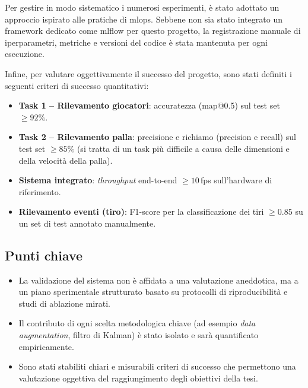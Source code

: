 \documentclass[12pt,a4paper,openright,twoside]{book}
\begin{document}
Per gestire in modo sistematico i numerosi esperimenti, è stato adottato un approccio ispirato alle pratiche di
\ac{mlops}. Sebbene non sia stato integrato un framework dedicato come \ac{mlflow} per questo progetto,
la registrazione manuale di iperparametri, metriche e versioni del codice è stata mantenuta per ogni esecuzione.

Infine, per valutare oggettivamente il successo del progetto, sono stati definiti i seguenti criteri di
successo quantitativi:

\begin{itemize}
  \item \textbf{Task 1 -- Rilevamento giocatori}: accuratezza (\ac{map}@0.5) sul test set $\geq 92\%$.
  \item \textbf{Task 2 -- Rilevamento palla}: precisione e richiamo (precision e recall) sul test set $\geq 85\%$
  (si tratta di un task più difficile a causa delle dimensioni e della velocità della palla).
  \item \textbf{Sistema integrato}: \emph{throughput} end-to-end $\geq 10$\,\ac{fps} sull'hardware di riferimento.
  \item \textbf{Rilevamento eventi (tiro)}: F1-score per la classificazione dei tiri $\geq 0.85$ su un set di test
  annotato manualmente.
\end{itemize}

\subsection*{Punti chiave}
\begin{itemize}
  \item La validazione del sistema non è affidata a una valutazione aneddotica, ma a un piano sperimentale
  strutturato basato su protocolli di riproducibilità e studi di ablazione mirati.
  \item Il contributo di ogni scelta metodologica chiave (ad esempio \emph{data augmentation}, filtro di Kalman) è stato isolato e
  sarà quantificato empiricamente.
  \item Sono stati stabiliti chiari e misurabili criteri di successo che permettono una valutazione oggettiva
  del raggiungimento degli obiettivi della tesi.
\end{itemize}
\end{document}
